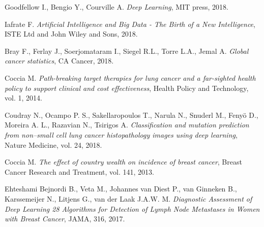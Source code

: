 \documentclass[a4paper]{article}
\begin{document}
\appendix

\iffalse
 

\fi

\bigskip
\newpage

\begin{thebibliography}{9}

 Goodfellow I., Bengio Y., Courville A. \emph{Deep Learning}, MIT press, 2018.

 Iafrate F. \emph{Artificial Intelligence and Big Data - The Birth of a New Intelligence}, ISTE Ltd and John Wiley and Sons, 2018.

 Bray F., Ferlay J., Soerjomataram I., Siegel R.L., Torre L.A., Jemal A. \emph{Global cancer statistics}, CA Cancer, 2018.

 Coccia M. \emph{Path-breaking target therapies for lung cancer and a far-sighted health policy to support clinical and cost effectiveness}, Health Policy and Technology, vol. 1, 2014.

 Coudray N., Ocampo P. S., Sakellaropoulos T., Narula N., Snuderl M., Fenyö D., Moreira A. L., Razavian N., Tsirigos A. \emph{Classification and mutation prediction from non–small cell lung cancer histopathology images using deep learning}, Nature Medicine, vol. 24, 2018.

 Coccia M. \emph{The effect of country wealth on incidence of breast cancer}, Breast Cancer Research and Treatment, vol. 141, 2013.

 Ehteshami Bejnordi B., Veta M., Johannes van Diest P., van Ginneken B., Karssemeijer N., Litjens G., van der Laak J.A.W. M. \emph{Diagnostic Assessment of Deep Learning 28 Algorithms for Detection of Lymph Node Metastases in Women with Breast Cancer}, JAMA, 316, 2017.

\end{thebibliography}
\end{document}
